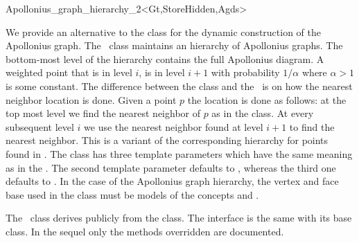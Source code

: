 
\begin{ccRefClass}{Apollonius_graph_hierarchy_2<Gt,StoreHidden,Agds>}

\ccDefinition

We provide an alternative to the class
 for the dynamic
construction of the Apollonius graph. The \ccRefName\ class maintains
an hierarchy of Apollonius graphs. The bottom-most level of the
hierarchy contains the full Apollonius diagram. A weighted point that
is in level $i$, is in level $i+1$ with probability $1/\alpha$
where $\alpha > 1$ is some constant. The difference between the
 class and the
\ccRefName\ is on how the nearest neighbor location is done. Given a
point $p$ the location is done as follows: at the top most level we
find the nearest neighbor of $p$ as in the
 class. At every
subsequent level $i$ we use the nearest neighbor found at level $i+1$
to find the nearest neighbor. This is a variant of the corresponding
hierarchy for points found in \cite{d-iirdt-98}.
%
The class has three template parameters which have the same meaning as
in the . The second
template parameter defaults to , whereas the third one
defaults to . 
In the case of the Apollonius graph hierarchy, the vertex and face
base used in the  class
must be models of the concepts
 and
.

The \ccRefName\ class derives publicly from the
 class. The interface is
the same with its base class. In the sequel only the methods
overridden are documented.



\end{ccRefClass}
